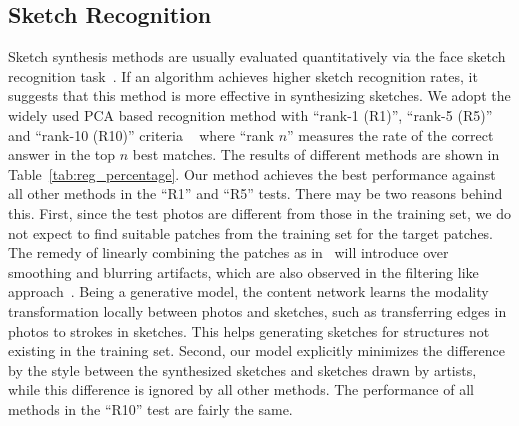 \documentclass[10pt,twocolumn,letterpaper]{article}
\begin{document}
{
\subsection{Sketch Recognition}
}
Sketch synthesis methods are usually evaluated quantitatively  via the face sketch recognition task~\cite{song2014real,wang2009face,zhang2015end,zhou2012markov}. If an algorithm achieves higher sketch recognition rates, it suggests that this method is more effective in synthesizing sketches. We adopt the widely used PCA based recognition method with ``rank-1 (R1)'', ``rank-5 (R5)'' and ``rank-10 (R10)'' criteria ~\cite{wang2009face} where ``rank $n$'' measures the rate of the correct answer in the top $n$ best matches. The results of different methods are shown in Table~\ref{tab:reg_percentage}. Our method achieves the best performance against all other methods in the ``R1'' and ``R5'' tests. There may be two reasons behind this. First, since the test photos are different from those in the training set, we do not expect to find suitable patches from the training set for the target patches. The remedy of linearly combining the patches as in~\cite{zhou2012markov} will introduce over smoothing and blurring artifacts, which are also observed in the filtering like approach~\cite{song2014real}. Being a generative model, the content network learns the modality transformation locally between photos and sketches, such as transferring edges in photos to strokes in sketches. This helps generating sketches for structures not existing in the training set. Second, our model explicitly minimizes the difference by the style between the synthesized sketches and sketches drawn by artists, while this difference is ignored by all other methods. The performance of all methods in the ``R10'' test are fairly the same. 
\end{document}
